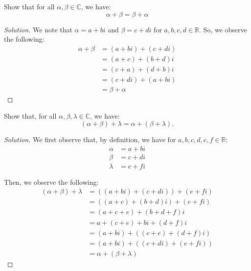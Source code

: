 \documentclass[openany]{book}
\newenvironment{solution}{\begin{proof}[Solution]}{\end{proof}}
\newcommand{\CC}{\mathbb{C}}
\newcommand{\RR}{\mathbb{R}}
\begin{document}
	\begin{hw}
		Show that for all $\alpha, \beta \in \CC$, we have:
		\begin{equation*}
			\alpha + \beta = \beta + \alpha
		\end{equation*}
	\end{hw}
	\begin{solution}
		We note that $\alpha = a + bi$ and $\beta = c + di$ for $a,b,c,d \in \RR$. So, we observe the following:
		\begin{align*}
			\alpha + \beta &= (a+bi) + (c+di) \\
			&= (a+c) + (b+d)i \\
			&= (c+a) + (d+b)i \\
			&= (c+di) + (a+bi) \\
			&= \beta + \alpha
		\end{align*}
	\end{solution}

	\begin{hw}
		Show that, for all $\alpha,\beta,\lambda \in \CC$, we have:
		\begin{equation*}
			(\alpha + \beta) + \lambda = \alpha + (\beta + \lambda).
		\end{equation*}
	\end{hw}
	\begin{solution}
		We first observe that, by definition, we have for $a,b,c,d,e,f \in \RR$:
		\begin{align*}
			\alpha &= a + bi \\
			\beta &= c + di \\
			\lambda &= e + fi
		\end{align*}
	
		Then, we observe the following:
		\begin{align*}
			(\alpha + \beta) + \lambda &= ( (a+bi) + (c + di)) + (e + fi) \\
			&= ((a + c) + (b + d)i) + (e + fi) \\
			&= (a+c+e) + (b+d+f)i \\
			&= a + (c+e) + bi + (d + f)i \\
			&= (a+bi) + ( (c+e) + (d + f)i) \\
			&= (a + bi) + ( (c + di) + (e + fi)) \\
			&= \alpha + (\beta + \lambda)
		\end{align*}
	\end{solution}
\end{document}
